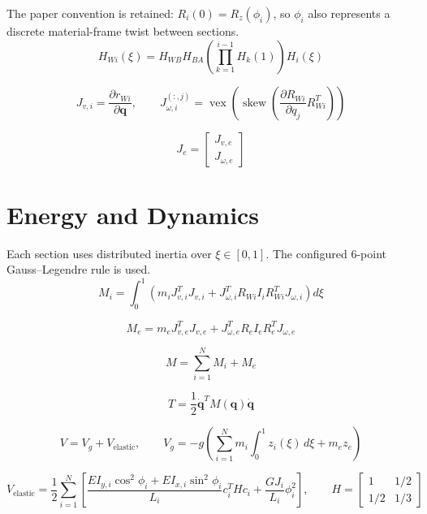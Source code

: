 \documentclass[11pt]{article}
\begin{document}
The paper convention is retained: $R_i(0)=R_z(\phi_i)$, so $\phi_i$ also represents a discrete material-frame twist between sections.
\begin{equation}
H_{Wi}(\xi)=H_{WB}H_{BA}\left(\prod_{k=1}^{i-1}H_k(1)\right)H_i(\xi)
\end{equation}

\begin{equation}
J_{v,i}=\frac{\partial r_{Wi}}{\partial\boldsymbol q},\qquad J_{\omega,i}^{(:,j)}=\operatorname{vex}\!\left(\operatorname{skew}\!\left(\frac{\partial R_{Wi}}{\partial q_j}R_{Wi}^{T}\right)\right)
\end{equation}

\begin{equation}
J_e=\begin{bmatrix}J_{v,e}\\J_{\omega,e}\end{bmatrix}
\end{equation}


\section{Energy and Dynamics}
Each section uses distributed inertia over $\xi\in[0,1]$. The configured 6-point Gauss--Legendre rule is used.
\begin{equation}
M_i=\int_0^1\!\left(m_iJ_{v,i}^{T}J_{v,i}+J_{\omega,i}^{T}R_{Wi}I_iR_{Wi}^{T}J_{\omega,i}\right)d\xi
\end{equation}

\begin{equation}
M_e=m_eJ_{v,e}^{T}J_{v,e}+J_{\omega,e}^{T}R_eI_eR_e^TJ_{\omega,e}
\end{equation}

\begin{equation}
M=\sum_{i=1}^{N}M_i+M_e\label{eq:mass-assembly}
\end{equation}

\begin{equation}
T=\frac12\dot{\boldsymbol q}^{T}M(\boldsymbol q)\dot{\boldsymbol q}
\end{equation}

\begin{equation}
V=V_g+V_{\mathrm{elastic}},\qquad V_g=-g\!\left(\sum_{i=1}^{N}m_i\int_0^1z_i(\xi)\,d\xi+m_ez_e\right)
\end{equation}

\begin{equation}
V_{\mathrm{elastic}}=\frac12\sum_{i=1}^{N}\left[\frac{EI_{y,i}\cos^2\phi_i+EI_{x,i}\sin^2\phi_i}{L_i}c_i^THc_i+\frac{GJ_i}{L_i}\phi_i^2\right],\qquad H=\begin{bmatrix}1&1/2\\1/2&1/3\end{bmatrix}
\end{equation}
\end{document}
